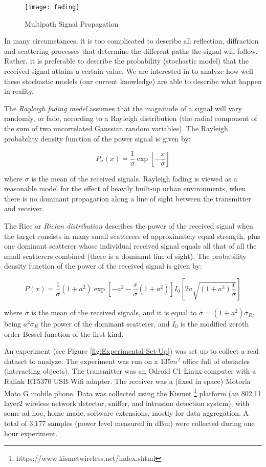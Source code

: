 \begin{figure}[h]
\centering\texttt{[image: fading]}
\caption{\label{fig:Multipath-Signal-Propagation}Multipath Signal Propagation}
\end{figure}

In many circumstances, it is too complicated to describe all reflection, diffraction and scattering processes that determine the different paths the signal will follow. Rather, it is preferable to describe the probability (stochastic model) that the received signal attains a certain value. We are interested in to analyze how well these stochastic models (our current knowledge) are able to describe what happen in reality.

The \emph{Rayleigh fading model} assumes that the magnitude of a signal will vary randomly, or fade, according to a Rayleigh distribution (the radial component of the sum of two uncorrelated Gaussian random variables). The Rayleigh probability density function of the power signal is given by:

\[
P_{\sigma}\left(x\right)=\frac{1}{\sigma}\exp\left[-\frac{x}{\sigma}\right]
\]

where $\sigma$ is the mean of the received signals. Rayleigh fading is viewed as a reasonable model for the effect of heavily built-up urban environments, when there is no dominant propagation along a line of sight between the transmitter and receiver.

The Rice or \emph{Rician distribution} describes the power of the received signal when the target consists in many small scatterers of approximately equal strength, plus one dominant scatterer whose individual received signal equals all that of all the small scatterers combined (there is a dominant line of sight). The probability density function of the power of the received signal is given by:

\[
P(x)=\frac{1}{\bar{\sigma}}\left(1+a^{2}\right)\exp\left[-a^{2}-\frac{x}{\bar{\sigma}}\left(1+a^{2}\right)\right]I_{0}\left[2a\sqrt{\left(1+a^{2}\right)\frac{x}{\bar{\sigma}}}\right]
\]


where $\bar{\sigma}$ is the mean of the received signals, and it is equal to $\bar{\sigma}=\left(1+a^{2}\right)\bar{\sigma}_{R}$, being $a^{2}\bar{\sigma}_{R}$ the power of the dominant scatterer, and $I_{0}$ is the modified zeroth order Bessel function of the first kind.

An experiment (see Figure \ref{fig:Experimental-Set-Up}) was set up to collect a real dataset to analyze. The experiment was run on a $135 m^2$ office full of obstacles (interacting objects). The transmitter was an Odroid C1 Linux computer with a Ralink RT5370 USB Wifi adapter. The receiver was a (fixed in space) Motorla Moto G mobile phone. Data was collected using the Kismet \footnote{https://www.kismetwireless.net/index.shtml} platform (an 802.11 layer2 wireless network detector, sniffer, and intrusion detection system), with some ad hoc, home made, software extensions, mostly for data aggregation. A total of 3,177 samples (power level measured in dBm) were collected during one hour experiment.

